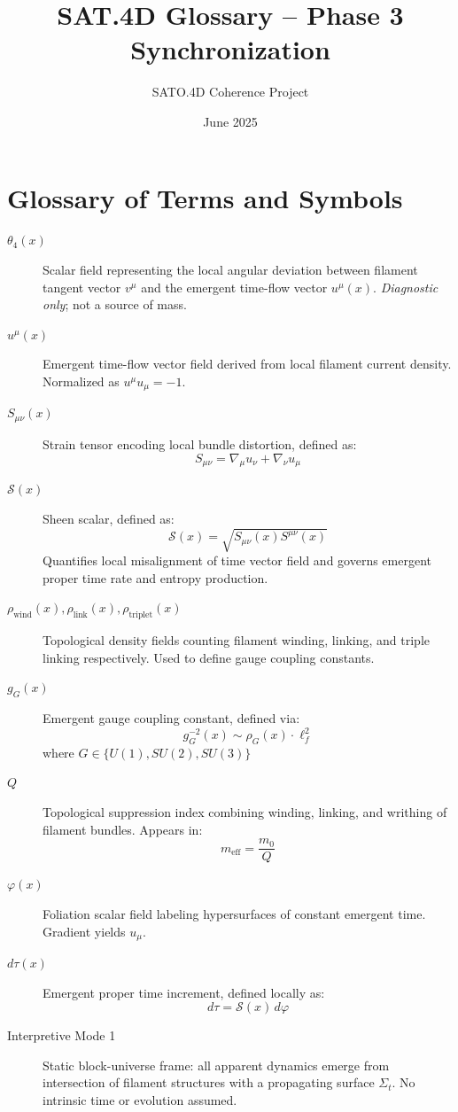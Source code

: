 \documentclass[12pt]{article}
\title{SAT.4D Glossary – Phase 3 Synchronization}
\author{SATO.4D Coherence Project}
\date{June 2025}
\begin{document}
\maketitle

\section*{Glossary of Terms and Symbols}

\begin{description}

\item[\( \theta_4(x) \)] 
Scalar field representing the local angular deviation between filament tangent vector \( v^\mu \) and the emergent time-flow vector \( u^\mu(x) \). \emph{Diagnostic only}; not a source of mass.

\item[\( u^\mu(x) \)] 
Emergent time-flow vector field derived from local filament current density. Normalized as \( u^\mu u_\mu = -1 \).

\item[\( S_{\mu\nu}(x) \)] 
Strain tensor encoding local bundle distortion, defined as:
\[
S_{\mu\nu} = \nabla_\mu u_\nu + \nabla_\nu u_\mu
\]

\item[\( \mathcal{S}(x) \)] 
Sheen scalar, defined as:
\[
\mathcal{S}(x) = \sqrt{S_{\mu\nu}(x) S^{\mu\nu}(x)}
\]
Quantifies local misalignment of time vector field and governs emergent proper time rate and entropy production.

\item[\( \rho_{\text{wind}}(x), \rho_{\text{link}}(x), \rho_{\text{triplet}}(x) \)] 
Topological density fields counting filament winding, linking, and triple linking respectively. Used to define gauge coupling constants.

\item[\( g_G(x) \)] 
Emergent gauge coupling constant, defined via:
\[
g_G^{-2}(x) \sim \rho_G(x) \cdot \ell_f^2
\]
where \( G \in \{ U(1), SU(2), SU(3) \} \)

\item[\( Q \)] 
Topological suppression index combining winding, linking, and writhing of filament bundles. Appears in:
\[
m_{\text{eff}} = \frac{m_0}{Q}
\]

\item[\( \varphi(x) \)] 
Foliation scalar field labeling hypersurfaces of constant emergent time. Gradient yields \( u_\mu \).

\item[\( d\tau(x) \)] 
Emergent proper time increment, defined locally as:
\[
d\tau = \mathcal{S}(x) \, d\varphi
\]

\item[Interpretive Mode 1] 
Static block-universe frame: all apparent dynamics emerge from intersection of filament structures with a propagating surface \( \Sigma_t \). No intrinsic time or evolution assumed.

\end{description}
\end{document}
